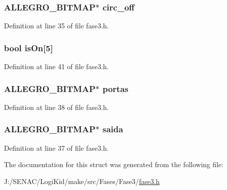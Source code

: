 \hypertarget{struct_level_tres_ac4adb5152cb42a0bc363375e1ad17229}{
\subsubsection[{circ\-\_\-off}]{\setlength{\rightskip}{0pt plus 5cm}A\-L\-L\-E\-G\-R\-O\-\_\-\-B\-I\-T\-M\-A\-P$\ast$ circ\-\_\-off}}\label{struct_level_tres_ac4adb5152cb42a0bc363375e1ad17229}


Definition at line 35 of file fase3.\-h.

\hypertarget{struct_level_tres_a59f6fe985ed5513f62660b2926c812aa}{
\subsubsection[{is\-On}]{\setlength{\rightskip}{0pt plus 5cm}bool is\-On\mbox{[}5\mbox{]}}}\label{struct_level_tres_a59f6fe985ed5513f62660b2926c812aa}


Definition at line 41 of file fase3.\-h.

\hypertarget{struct_level_tres_a6c47128335a6e9846fb9576bace5a597}{
\subsubsection[{portas}]{\setlength{\rightskip}{0pt plus 5cm}A\-L\-L\-E\-G\-R\-O\-\_\-\-B\-I\-T\-M\-A\-P$\ast$ portas}}\label{struct_level_tres_a6c47128335a6e9846fb9576bace5a597}


Definition at line 38 of file fase3.\-h.

\hypertarget{struct_level_tres_a94c49a6b9d708df64de4deb034ca5b10}{
\subsubsection[{saida}]{\setlength{\rightskip}{0pt plus 5cm}A\-L\-L\-E\-G\-R\-O\-\_\-\-B\-I\-T\-M\-A\-P$\ast$ saida}}\label{struct_level_tres_a94c49a6b9d708df64de4deb034ca5b10}


Definition at line 37 of file fase3.\-h.



The documentation for this struct was generated from the following file\-:\begin{DoxyCompactItemize}
\item 
J\-:/\-S\-E\-N\-A\-C/\-Logi\-Kid/make/src/\-Fases/\-Fase3/\hyperlink{fase3_8h}{fase3.\-h}\end{DoxyCompactItemize}
